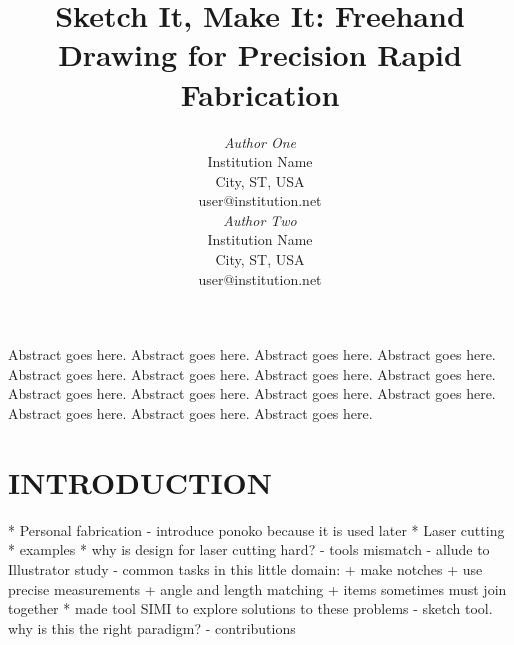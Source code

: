 \documentclass{article}
\begin{document}

\toappear{}



\title{Sketch It, Make It: Freehand Drawing for Precision Rapid Fabrication}

\author{
\parbox[t]{9cm}{\centering
	     {\em Author One}\\
	     Institution Name\\
             City, ST, USA\\
	     user@institution.net}
\parbox[t]{9cm}{\centering
	     {\em Author Two}\\
	     Institution Name\\
             City, ST, USA\\
	     user@institution.net}
}

\maketitle

\abstract Abstract goes here. Abstract goes here. Abstract goes
here. Abstract goes here. Abstract goes here. Abstract goes
here. Abstract goes here. Abstract goes here. Abstract goes
here. Abstract goes here. Abstract goes here. Abstract goes
here. Abstract goes here. Abstract goes here. Abstract goes here.






\section{INTRODUCTION}
* Personal fabrication
  - introduce ponoko because it is used later
* Laser cutting
* examples
* why is design for laser cutting hard?
  - tools mismatch
  - allude to Illustrator study
  - common tasks in this little domain:
    + make notches
    + use precise measurements
    + angle and length matching
    + items sometimes must join together
* made tool SIMI to explore solutions to these problems
  - sketch tool. why is this the right paradigm?
  - contributions
\end{document}
